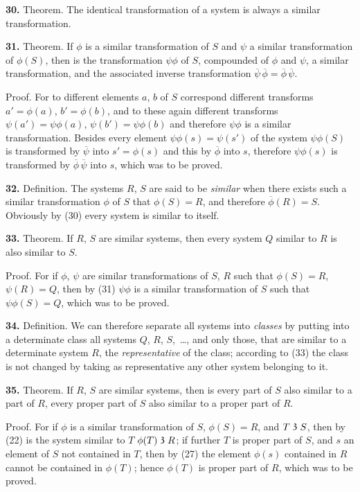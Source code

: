 \documentclass[oneside]{book}
\newcommand\partof{\mathrel{\raisebox{0.45ex}{$\mathfrak{3}$}}}   %
\newcommand\mypara{\medskip\textbf}
\begin{document}
\mypara{30.} Theorem. The identical transformation of a
system is always a similar transformation.

\mypara{31.} Theorem. If $\phi$ is a similar transformation of
$S$ and $\psi$ a similar transformation of $\phi(S)$, then is the
transformation $\psi\phi$ of $S$, compounded of $\phi$ and $\psi$, a similar
transformation, and the associated inverse transformation
$\overline{\psi}\,\overline{\phi} = \overline{\phi}\,\overline{\psi}$.

Proof. For to different elements $a$, $b$ of $S$ correspond
different transforms $a' = \phi(a)$, $b'=\phi(b)$, and
to these again different transforms $\psi(a')=\psi\phi(a)$,
$\psi(b') =\psi\phi(b)$ and therefore $\psi\phi$ is a similar transformation.
Besides every element $\psi\phi(s) = \psi(s')$ of the
system $\psi\phi(S)$ is transformed by $\overline{\psi}$ into $s' = \phi(s)$ and
this by $\overline{\phi}$ into $s$, therefore $\psi\phi(s)$ is transformed by
$\overline{\phi}\,\overline{\psi}$ into $s$, which was to be proved.

\mypara{32.} Definition. The systems $R$, $S$ are said to be
\textit{similar} when there exists such a similar transformation
$\phi$ of $S$ that $\phi(S)=R$, and therefore $\overline{\phi}(R) = S$.
Obviously by (30) every system is similar to itself.

\mypara{33.} Theorem. If $R$, $S$ are similar systems, then
every system $Q$ similar to $R$ is also similar to $S$.

Proof. For if $\phi$, $\psi$ are similar transformations of
$S$, $R$ such that $\phi(S)=R$, $\psi(R)=Q$, then by (31) $\psi\phi$
is a similar transformation of $S$ such that $\psi\phi(S) = Q$,
which was to be proved.

\mypara{34.} Definition. We can therefore separate all systems
into \textit{classes} by putting into a determinate class
all systems $Q$, $R$, $S$,~\ldots, and only those, that are
similar to a determinate system $R$, the \textit{representative}
of the class; according to (33) the class is not changed
by taking as representative any other system belonging
to it.

\mypara{35.} Theorem. If $R$, $S$ are similar systems, then
is every part of $S$ also similar to a part of $R$, every
proper part of $S$ also similar to a proper part of $R$.

Proof. For if $\phi$ is a similar transformation of $S$,
$\phi(S)=R$, and $T \partof S$, then by (22) is the system similar
to $T$ $\phi(T) \partof R$; if further $T$ is proper part of $S$,
and $s$ an element of $S$ not contained in $T$, then by (27)
the element $\phi(s)$ contained in $R$ cannot be contained
in $\phi(T)$; hence $\phi(T)$ is proper part of $R$, which was
to be proved.
\end{document}
